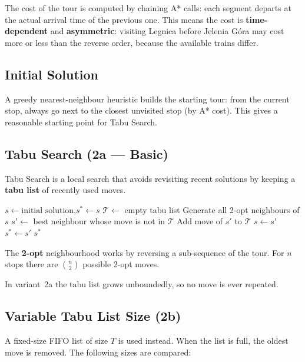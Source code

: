 \documentclass[12pt,a4paper]{article}
\begin{document}
The cost of the tour is computed by chaining A* calls: each segment departs at
the actual arrival time of the previous one. This means the cost is
\textbf{time-dependent} and \textbf{asymmetric}:
visiting Legnica before Jelenia Góra may cost more or less than the reverse
order, because the available trains differ.

\subsection{Initial Solution}

A greedy nearest-neighbour heuristic builds the starting tour: from the current
stop, always go next to the closest unvisited stop (by A* cost). This gives a
reasonable starting point for Tabu Search.

\subsection{Tabu Search (2a — Basic)}

Tabu Search is a local search that avoids revisiting recent solutions by
keeping a \textbf{tabu list} of recently used moves.

\begin{algorithm}[H]
\caption{Tabu Search}
\begin{algorithmic}[1]
\State $s \leftarrow \text{initial solution}$,\quad $s^* \leftarrow s$
\State $\mathcal{T} \leftarrow$ empty tabu list
  \State Generate all 2-opt neighbours of $s$
  \State $s' \leftarrow$ best neighbour whose move is not in $\mathcal{T}$
  \State Add move of $s'$ to $\mathcal{T}$
  \State $s \leftarrow s'$
   $s^* \leftarrow s'$ \EndIf
\EndFor
\State \Return $s^*$
\end{algorithmic}
\end{algorithm}

The \textbf{2-opt} neighbourhood works by reversing a sub-sequence of the tour.
For $n$ stops there are $\binom{n}{2}$ possible 2-opt moves.

In variant~2a the tabu list grows unboundedly, so no move is ever repeated.

\subsection{Variable Tabu List Size (2b)}

A fixed-size FIFO list of size $T$ is used instead. When the list is full, the
oldest move is removed. The following sizes are compared:
\end{document}

